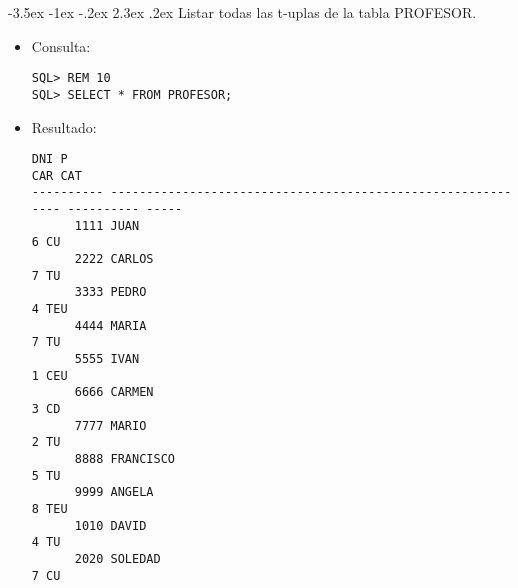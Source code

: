 \documentclass[11pt]{report}
\makeatletter
\renewcommand\chapter{\@startsection{chapter}{0}{\z@}%
    {-3.5ex \@plus -1ex \@minus -.2ex}%
    {2.3ex \@plus.2ex}%
    {\normalfont\Large\bfseries}}
\makeatother
\begin{document}
\chapter{Listar todas las t-uplas de la tabla PROFESOR.}
\begin{itemize}
  \item Consulta:
  \begin{verbatim}
SQL> REM 10
SQL> SELECT * FROM PROFESOR;
  \end{verbatim}
  \item{Resultado:}
  \begin{verbatim}
DNI P                                                                          CAR CAT                                                                                                                  
---------- ------------------------------------------------------------ ---------- -----                                                                                                                
      1111 JUAN                                                                  6 CU                                                                                                                   
      2222 CARLOS                                                                7 TU                                                                                                                   
      3333 PEDRO                                                                 4 TEU                                                                                                                  
      4444 MARIA                                                                 7 TU                                                                                                                   
      5555 IVAN                                                                  1 CEU                                                                                                                  
      6666 CARMEN                                                                3 CD                                                                                                                   
      7777 MARIO                                                                 2 TU                                                                                                                   
      8888 FRANCISCO                                                             5 TU                                                                                                                   
      9999 ANGELA                                                                8 TEU                                                                                                                  
      1010 DAVID                                                                 4 TU                                                                                                                   
      2020 SOLEDAD                                                               7 CU                                                                                                                   


\end{verbatim}
\end{itemize}
\end{document}
